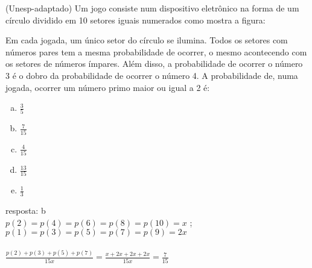 \begin{ex}
 (Unesp-adaptado) Um jogo consiste num dispositivo eletrônico na forma de um círculo dividido em 10 setores iguais numerados como mostra a figura:
 \begin{center}
 \end{center}
Em cada jogada, um único setor do círculo se ilumina. Todos os setores com números pares tem a mesma probabilidade de ocorrer, o mesmo acontecendo com os setores  de números ímpares. Além disso, a probabilidade de ocorrer o número 3 é o dobro da probabilidade de ocorrer o número 4. A probabilidade de, numa jogada, ocorrer um número primo maior ou igual a 2 é:
    \begin{enumerate}[(a)]
    \item $\frac{3}{5}$
    \item $\frac{7}{15}$
    \item $\frac{4}{15}$
    \item $\frac{13}{15}$
    \item $\frac{1}{3}$
    \end{enumerate}
      \begin{sol}
      resposta: b  \\
       $p(2)=p(4)=p(6)=p(8)=p(10)=x$ ;  $p(1)=p(3)=p(5)=p(7)=p(9)=2x$ \\ \\
       $\frac{p(2)+p(3)+p(5)+p(7)}{15x}=\frac{x+2x+2x+2x}{15x}=\frac{7}{15}$
      \end{sol}
\end{ex}